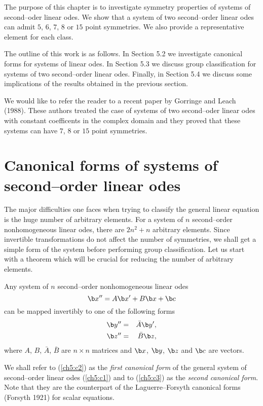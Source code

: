 The purpose of this chapter is to investigate symmetry properties of systems
of second--oder linear odes. We show that a system of two second--order linear
odes can admit $5$, $6$, $7$, $8$ or $15$  point symmetries. We also provide
a representative element for each class.

The outline of this work is as follows. In Section 5.2 we investigate
canonical forms for systems of linear odes. In Section 5.3 we discuss
group classification for systems of two second--order linear odes. Finally,
in Section 5.4 we discuss some implications of the results obtained in the
previous section.

We would like to refer the
reader to a recent paper by Gorringe and Leach (1988). These authors
treated the case of systems of two second--oder linear odes
with constant coefficents in the complex
domain and they proved that these systems can have $7$, $8$ or $15$
point symmetries.


\section{Canonical forms of systems of second--order linear odes}
The major difficulties one faces when trying to classify the general linear
equation is the huge number of arbitrary elements. For a system of $n$
second--order nonhomogeneous linear odes, there are $2n^2+n$ arbitrary
elements. Since invertible transformations do not affect the number of
symmetries, we shall get a simple form of the system before performing
group classification. Let us start with a theorem which will be crucial for
reducing the number of arbitrary elements.
\begin{theo}
\begin{em}
\label{ch5:t1}
Any system of $n$ second--order nonhomogeneous linear odes
\begin{equation}
\label{ch5:c1}
\b x''=A\b x'+B\b x +\b c
\end{equation}
can be mapped invertibly to one of  the following forms
\begin{eqnarray}
\b y'' &=&\bar A \b y',  \label{ch5:c2} \\
\b z'' &= & \bar B \b z,  \label{ch5:c3} 
\end{eqnarray}
where $A$, $B$, $\bar A$, $\bar B$ are $n \times n$ matrices
and $\b x$, $\b y$, $\b z$ and $\b c$ are vectors.

We shall refer to (\ref{ch5:c2}) as
the {\em first canonical form} of the general system of second--order linear 
odes (\ref{ch5:c1})  and to (\ref{ch5:c3}) as the {\em second canonical form}. 
Note that they are the counterpart of the
Laguerre--Forsyth canonical forms (Forsyth 1921) for scalar equations.
\end{em}
\end{theo}

